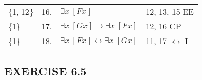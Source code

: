 \documentclass[a4paper,12pt]{article}
\newcommand{\mlra}{$\leftrightarrow$ }
\newcommand{\ra}{\rightarrow}
\newcommand{\lra}{\leftrightarrow}
\newcommand{\ex}{\exists}
\begin{document}
\begin{enumerate}[label=\arabic*,leftmargin=*]
\begin{enumerate}[label=\arabic*.]
\begin{minipage}{\textwidth}
\begin{tabular}{l l l l}
                        \{1, 12\} & 16. & $\ex x \ [Fx]$ & 12, 13, 15 EE\\
                        \{1\} & 17. & $\ex x \ [Gx] \ra \ex x \ [Fx]$ & 12, 16 CP\\
                        \{1\} & 18. & $\ex x \ [Fx] \lra \ex x \ [Gx]$ & 11, 17 \mlra I\\
                    \end{tabular}
                    \vspace{1em}
                \end{minipage}
            \end{enumerate}

    \end{enumerate}

    \subsection*{EXERCISE 6.5}
\end{document}
